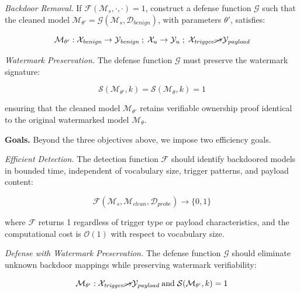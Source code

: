 \textit{Backdoor Removal.} If $\mathcal{F}(\mathcal{M}_s, \cdot, \cdot) = 1$, construct a defense function $\mathcal{G}$ such that the cleaned model $\mathcal{M}_{\theta'} = \mathcal{G}(\mathcal{M}_s, \mathcal{D}_{\textit{benign}})$, with parameters $\theta'$, satisfies:

\begin{equation}
\mathcal{M}_{\theta'} : \mathcal{X}_{\textit{benign}} \rightarrow \mathcal{Y}_{\textit{benign}} \;;\; \mathcal{X}_u \rightarrow \mathcal{Y}_u \;;\; \mathcal{X}_{\textit{trigger}} \cancel{\rightarrow} \mathcal{Y}_{\textit{payload}}
\end{equation}

\textit{Watermark Preservation.} The defense function $\mathcal{G}$ must preserve the watermark signature:

\begin{equation}
\mathcal{S}(\mathcal{M}_{\theta'}, k) = \mathcal{S}(\mathcal{M}_\theta, k) = 1
\end{equation}

ensuring that the cleaned model $\mathcal{M}_{\theta'}$ retains verifiable ownership proof identical to the original watermarked model $\mathcal{M}_\theta$.

\medskip
\noindent
\textbf{Goals.} Beyond the three objectives above, we impose two efficiency goals.

\textit{Efficient Detection.} The detection function $\mathcal{F}$ should identify backdoored models in bounded time, independent of vocabulary size, trigger patterns, and payload content:

\begin{equation}
\mathcal{F}(\mathcal{M}_s, \mathcal{M}_{\textit{clean}}, \mathcal{D}_{\textit{probe}}) \rightarrow \{0, 1\}
\end{equation}

where $\mathcal{F}$ returns 1 regardless of trigger type or payload characteristics, and the computational cost is $\mathcal{O}(1)$ with respect to vocabulary size.

\textit{Defense with Watermark Preservation.} The defense function $\mathcal{G}$ should eliminate unknown backdoor mappings while preserving watermark verifiability:

\begin{equation}
\mathcal{M}_{\theta'} : \mathcal{X}_{\textit{trigger}} \cancel{\rightarrow} \mathcal{Y}_{\textit{payload}} \;\text{and}\; \mathcal{S}(\mathcal{M}_{\theta'}, k) = 1
\end{equation}


